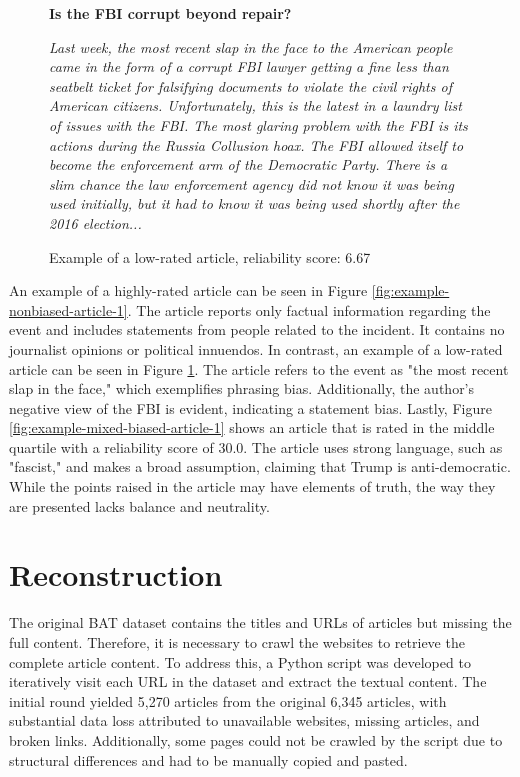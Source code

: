 \begin{figure}[htbp]
    \centering
    \begin{minipage}{0.9\linewidth}
        \begin{center}
            \small{\textbf{Is the FBI corrupt beyond repair?}}
        \end{center}
        \scriptsize{\textit{
                Last week, the most recent slap in the face to the American people came in the form of a corrupt FBI lawyer getting a fine less than seatbelt ticket for falsifying documents to violate the civil rights of American citizens. Unfortunately, this is the latest in a laundry list of issues with the FBI. The most glaring problem with the FBI is its actions during the Russia Collusion hoax. The FBI allowed itself to become the enforcement arm of the Democratic Party. There is a slim chance the law enforcement agency did not know it was being used initially, but it had to know it was being used shortly after the 2016 election...}}
    \end{minipage}
    \caption{Example of a low-rated article, reliability score: 6.67 \cite{spinde-2023-bat}}
    \label{fig:example-biased-article-1}
\end{figure}

An example of a highly-rated article can be seen in Figure \ref{fig:example-nonbiased-article-1}. The article reports only factual information regarding the event and includes statements from people related to the incident. It contains no journalist opinions or political innuendos. In contrast, an example of a low-rated article can be seen in Figure \ref{fig:example-biased-article-1}. The article refers to the event as "the most recent slap in the face," which exemplifies phrasing bias. Additionally, the author's negative view of the FBI is evident, indicating a statement bias. Lastly, Figure \ref{fig:example-mixed-biased-article-1} shows an article that is rated in the middle quartile with a reliability score of 30.0. The article uses strong language, such as "fascist," and makes a broad assumption, claiming that Trump is anti-democratic. While the points raised in the article may have elements of truth, the way they are presented lacks balance and neutrality.

\section{Reconstruction}

The original BAT dataset contains the titles and URLs of articles but missing the full content. Therefore, it is necessary to crawl the websites to retrieve the complete article content. To address this, a Python script was developed to iteratively visit each URL in the dataset and extract the textual content. The initial round yielded 5,270 articles from the original 6,345 articles, with substantial data loss attributed to unavailable websites, missing articles, and broken links. Additionally, some pages could not be crawled by the script due to structural differences and had to be manually copied and pasted.

